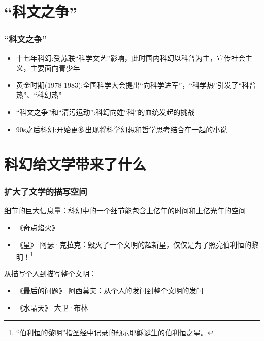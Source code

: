 \frame{\titlepage}

\section{“科文之争”}

\begin{frame}
  \frametitle{“科文之争”}

  \begin{itemize}
    \item \alert{十七年科幻}:受苏联“科学文艺”影响，此时国内科幻以科普为主，宣传社会主义，主要面向青少年
    \item \alert{黄金时期}(1978-1983):全国科学大会提出“向科学进军”，“科学热”引发了“科普热”、“科幻热”
    \item \alert{“科文之争”和“清污运动”}:科幻向姓“科”的血统发起的挑战
    \item \alert{90s之后科幻}:开始更多出现将科学幻想和哲学思考结合在一起的小说
  \end{itemize}
\end{frame}

\section{科幻给文学带来了什么}

\begin{frame}
  \frametitle{扩大了文学的描写空间}
  
  \alert{细节的巨大信息量}：科幻中的一个细节能包含上亿年的时间和上亿光年的空间
  \begin{itemize}
    \item \alert{《奇点焰火》}
    \item \alert{《星》} 阿瑟·克拉克：毁灭了一个文明的超新星，仅仅是为了照亮伯利恒的黎明！\footnote{“伯利恒的黎明”指圣经中记录的预示耶稣诞生的伯利恒之星。}
  
  \end{itemize}
  \vspace{0.4cm}
  \pause
  \alert{从描写个人到描写整个文明}：
  \begin{itemize}
    \item \alert{《最后的问题》} 阿西莫夫：从个人的发问到整个文明的发问
    \item \alert{《水晶天》} 大卫·布林
  \end{itemize}

\end{frame}

